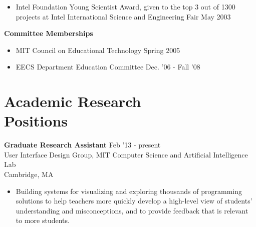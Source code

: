 \documentclass[margin]{res}
\begin{document}
\begin{resume}
\begin{itemize}
                 \item Intel Foundation Young Scientist Award, given to the top 3 out of 1300 projects at Intel International Science and Engineering Fair \hfill May 2003 
		 \end{itemize}


		 {\bf  Committee Memberships}  
                 \begin{itemize} \itemsep -2pt

               \item    MIT Council on Educational Technology \hfill Spring 2005 
                 
               \item  EECS Department Education Committee \hfill Dec. '06 - Fall '08
 \end{itemize}
		 


          

		
		 

\section{Academic Research \\Positions}

 {\bf Graduate Research Assistant} \hfill Feb '13 - present \\ User Interface Design Group, MIT Computer Science and Artificial Intelligence Lab \\ Cambridge, MA 
 \begin{itemize} \itemsep -2pt  %
 \item Building systems for visualizing and exploring thousands of programming solutions to help teachers more quickly develop a high-level view of students' understanding and misconceptions, and to provide feedback that is relevant to more students.
 \end{itemize}


\end{resume}
\end{document}
